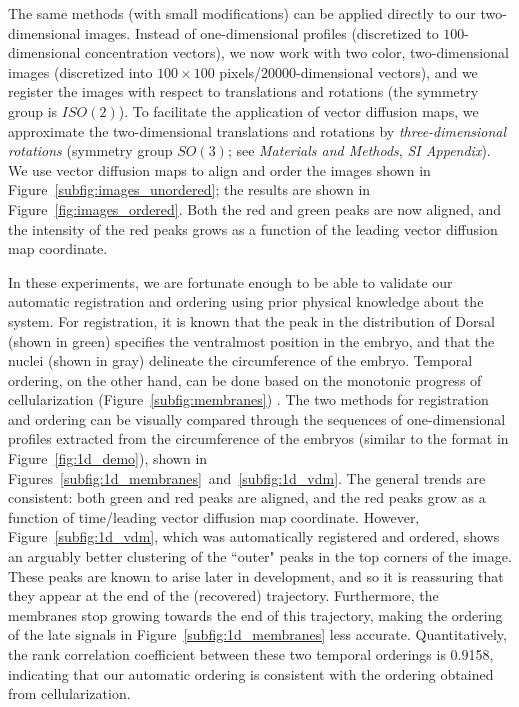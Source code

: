 \documentclass{pnastwo}
\begin{document}
\begin{article}
The same methods (with small modifications) can be applied directly to our two-dimensional images.
%
Instead of one-dimensional profiles (discretized to $100$-dimensional concentration vectors), we now work with
two color, two-dimensional images (discretized into $100 \times 100$ pixels/$20000$-dimensional vectors), and we register the images with respect to translations and rotations (the symmetry group is $ISO(2)$).
%
To facilitate the application of vector diffusion maps, we approximate the two-dimensional translations and rotations by {\em three-dimensional rotations} (symmetry group $SO(3)$; see {\it Materials and Methods}, {\it SI Appendix}).
%
We use vector diffusion maps to align and order the images shown in Figure~\ref{subfig:images_unordered};
the results are shown in Figure~\ref{fig:images_ordered}.
%
Both the red and green peaks are now aligned, and the intensity of the red peaks grows as a function of the leading vector diffusion map coordinate.

In these experiments, we are fortunate enough to be able to validate our  automatic registration and ordering using prior physical knowledge about the system.
%
For registration, it is known that the peak in the distribution of Dorsal (shown in green) specifies the ventralmost position in the embryo, and that the nuclei (shown in gray) delineate the circumference of the embryo.
%
%
Temporal ordering, on the other hand, can be done based on the monotonic progress of cellularization (Figure~\ref{subfig:membranes}) \cite{figard2013plasma}.%
%
The two methods for registration and ordering can be visually compared through the sequences of one-dimensional profiles extracted from the circumference of the embryos (similar to the format in Figure~\ref{fig:1d_demo}), shown in Figures~\ref{subfig:1d_membranes}~and~\ref{subfig:1d_vdm}.
%
The general trends are consistent:
both green  and red peaks are aligned, and the red peaks grow as a function of time/leading vector diffusion map coordinate.
%
However, Figure~\ref{subfig:1d_vdm}, which was automatically registered and ordered, shows an arguably better clustering of the ``outer" peaks in the top corners of the image.
%
%
These peaks are known to arise later in development, and so it is reassuring that they appear at the end of the (recovered) trajectory.
%
Furthermore, the membranes stop growing towards the end of this trajectory, making the ordering of the late signals in Figure~\ref{subfig:1d_membranes} less accurate.
%
Quantitatively, the rank correlation coefficient between these two temporal orderings is 0.9158, indicating that our automatic ordering is consistent with the ordering obtained from cellularization.


\end{article}
\end{document}
